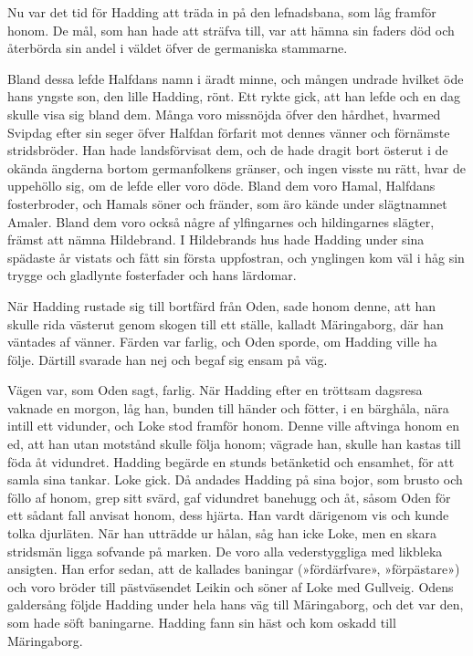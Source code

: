 Nu var det tid för Hadding att träda in på den lefnadsbana, som låg
framför honom. De mål, som han hade att
\protect\hypertarget{lb1625905.xhtmlux5cux23start155}{}{}\protect\hypertarget{lb1625905.xhtmlux5cux23start155-a}{}{}\protect\hypertarget{lb1625905.xhtmlux5cux23start155-b}{}{}\protect\hypertarget{lb1625905.xhtmlux5cux23start155-c}{}{}\protect\hypertarget{lb1625905.xhtmlux5cux23start155-d}{}{}
sträfva till, var att hämna sin faders död och återbörda sin andel i
väldet öfver de germaniska stammarne.

Bland dessa lefde Halfdans namn i äradt minne, och mången undrade
hvilket öde hans yngste son, den lille Hadding, rönt. Ett rykte gick,
att han lefde och en dag skulle visa sig bland dem. Många voro missnöjda
öfver den hårdhet, hvarmed Svipdag efter sin seger öfver Halfdan
förfarit mot dennes vänner och förnämste stridsbröder. Han hade
landsförvisat dem, och de hade dragit bort österut i de okända ängderna
bortom germanfolkens gränser, och ingen visste nu rätt, hvar de
uppehöllo sig, om de lefde eller voro döde. Bland dem voro Hamal,
Halfdans fosterbroder, och Hamals söner och fränder, som äro kände under
slägtnamnet Amaler. Bland dem voro också någre af ylfingarnes och
hildingarnes slägter, främst att nämna Hildebrand. I Hildebrands hus
hade Hadding under sina spädaste år vistats och fått sin första
uppfostran, och ynglingen kom väl i håg sin trygge och gladlynte
fosterfader och hans lärdomar.

När Hadding rustade sig till bortfärd från Oden, sade honom denne, att
han skulle rida västerut genom skogen till ett ställe, kalladt
Märingaborg, där han väntades af vänner. Färden var farlig, och Oden
sporde, om Hadding ville ha följe. Därtill svarade han nej och begaf sig
ensam på väg.

Vägen var, som Oden sagt, farlig. När Hadding efter en tröttsam dagsresa
vaknade en morgon, låg han, bunden till händer och fötter, i en
bärghåla, nära intill ett vidunder, och Loke stod framför honom. Denne
ville aftvinga honom en ed, att han utan motstånd skulle följa honom;
vägrade han, skulle han kastas till föda åt vidundret. Hadding begärde
en stunds betänketid och ensamhet, för att samla sina tankar. Loke gick.
Då andades Hadding på sina bojor, som brusto och föllo af honom, grep
sitt svärd, gaf vidundret banehugg och åt, såsom Oden för ett sådant
fall anvisat honom, dess hjärta. Han vardt därigenom vis och kunde tolka
djurläten. När han utträdde ur hålan, såg han icke Loke, men en skara
stridsmän ligga sofvande på marken. De voro alla
\protect\hypertarget{lb1625905.xhtmlux5cux23start156}{}{}\protect\hypertarget{lb1625905.xhtmlux5cux23start156-a}{}{}\protect\hypertarget{lb1625905.xhtmlux5cux23start156-b}{}{}\protect\hypertarget{lb1625905.xhtmlux5cux23start156-c}{}{}\protect\hypertarget{lb1625905.xhtmlux5cux23start156-d}{}{}
vederstyggliga med likbleka ansigten. Han erfor sedan, att de kallades
baningar (»fördärfvare», »förpästare») och voro bröder till pästväsendet
Leikin och söner af Loke med Gullveig. Odens galdersång följde Hadding
under hela hans väg till Märingaborg, och det var den, som hade söft
baningarne. Hadding fann sin häst och kom oskadd till Märingaborg.

